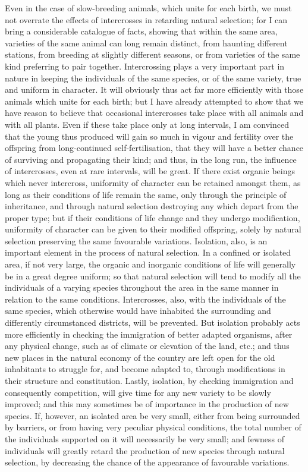 Even in the case of slow-breeding animals, which unite for each birth, we must not overrate the effects of intercrosses in retarding natural selection; for I can bring a considerable catalogue of facts, showing that within the same area, varieties of the same animal can long remain distinct, from haunting different stations, from breeding at slightly different seasons, or from varieties of the same kind preferring to pair together.
Intercrossing plays a very important part in nature in keeping the individuals of the same species, or of the same variety, true and uniform in character. It will obviously thus act far more efficiently with those animals which unite for each birth; but I have already attempted to show that we have reason to believe that occasional intercrosses take place with all animals and with all plants. Even if these take place only at long intervals, I am convinced that the young thus produced will gain so much in vigour and fertility over the offspring from long-continued self-fertilisation, that they will have a better chance of surviving and propagating their kind; and thus, in the long run, the influence of intercrosses, even at rare intervals, will be great. If there exist organic beings which never intercross, uniformity of character can be retained amongst them, as long as their conditions of life remain the same, only through the principle of inheritance, and through natural selection destroying any which depart from the proper type; but if their conditions of life change and they undergo modification, uniformity of character can be given to their modified offspring, solely by natural selection preserving the same favourable variations.
Isolation, also, is an important element in the process of natural selection. In a confined or isolated area, if not very large, the organic and inorganic conditions of life will generally be in a great degree uniform; so that natural selection will tend to modify all the individuals of a varying species throughout the area in the same manner in relation to the same conditions. Intercrosses, also, with the individuals of the same species, which otherwise would have inhabited the surrounding and differently circumstanced districts, will be prevented. But isolation probably acts more efficiently in checking the immigration of better adapted organisms, after any physical change, such as of climate or elevation of the land, etc.; and thus new places in the natural economy of the country are left open for the old inhabitants to struggle for, and become adapted to, through modifications in their structure and constitution. Lastly, isolation, by checking immigration and consequently competition, will give time for any new variety to be slowly improved; and this may sometimes be of importance in the production of new species. If, however, an isolated area be very small, either from being surrounded by barriers, or from having very peculiar physical conditions, the total number of the individuals supported on it will necessarily be very small; and fewness of individuals will greatly retard the production of new species through natural selection, by decreasing the chance of the appearance of favourable variations.
